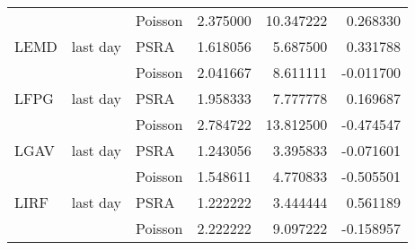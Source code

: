 \begin{tabular}{lllrrr}
     &          & Poisson &  2.375000 &  10.347222 &  0.268330 \\
LEMD & last day & PSRA &  1.618056 &   5.687500 &  0.331788 \\
     &          & Poisson &  2.041667 &   8.611111 & -0.011700 \\
LFPG & last day & PSRA &  1.958333 &   7.777778 &  0.169687 \\
     &          & Poisson &  2.784722 &  13.812500 & -0.474547 \\
LGAV & last day & PSRA &  1.243056 &   3.395833 & -0.071601 \\
     &          & Poisson &  1.548611 &   4.770833 & -0.505501 \\
LIRF & last day & PSRA &  1.222222 &   3.444444 &  0.561189 \\
     &          & Poisson &  2.222222 &   9.097222 & -0.158957 \\
\bottomrule
\end{tabular}
